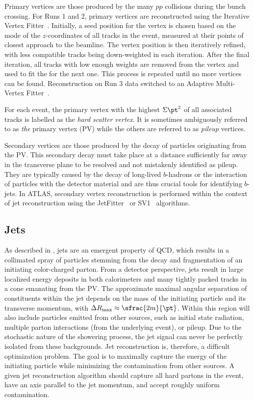 Primary vertices are those produced by the many $pp$ collisions during the bunch crossing.
For Runs 1 and 2, primary vertices are reconstructed using the Iterative Vertex Fitter~\cite{ATLASVertex}.
Initially, a seed position for the vertex is chosen based on the mode of the $z$-coordinates of all tracks in the event, measured at their points of closest approach to the beamline.
The vertex position is then iteratively refined, with less compatible tracks being down-weighted in each iteration.
After the final iteration, all tracks with low enough weights are removed from the vertex and used to fit the for the next one.
This process is repeated until no more vertices can be found.
Reconstruction on Run 3 data switched to an Adaptive Multi-Vertex Fitter~\cite{Run3Vertex}.

For each event, the primary vertex with the highest $\Sigma\pt^2$ of all associated tracks is labelled as the \textit{hard scatter vertex}.
It is sometimes ambiguously referred to as \textit{the} primary vertex (PV) while the others are referred to as \textit{pileup} vertices.

Secondary vertices are those produced by the decay of particles originating from the PV.
This secondary decay must take place at a distance sufficiently far away in the transverse plane to be resolved and not mistakenly identified as pileup.
They are typically caused by the decay of long-lived $b$-hadrons or the interaction of particles with the detector material and are thus crucial tools for identifying $b$-jets.
In ATLAS, secondary vertex reconstruction is performed within the context of jet reconstruction using the JetFitter~\cite{JetFitter} or SV1~\cite{SV1} algorithms.

\subsection{Jets}
\label{sec:jets_reconstruction}

As described in , jets are an emergent property of QCD\@, which results in a collimated spray of particles stemming from the decay and fragmentation of an initiating color-charged parton.
From a detector perspective, jets result in large localized energy deposits in both calorimeters and many tightly packed tracks in a cone emanating from the PV.
The approximate maximal angular separation of constituents within the jet depends on the mass of the initiating particle and its transverse momentum, with $\Delta R_\text{max} \approx \sfrac{2m}{\pt}$.
Within this region will also include particles emitted from other sources, such as initial state radiation, multiple parton interactions (from the underlying event), or pileup.
Due to the stochastic nature of the showering process, the jet signal can never be perfectly isolated from these backgrounds.
Jet reconstruction is, therefore, a difficult optimization problem.
The goal is to maximally capture the energy of the initiating particle while minimizing the contamination from other sources.
A given jet reconstruction algorithm should capture all hard partons in the event, have an axis parallel to the jet momentum, and accept roughly uniform contamination.

